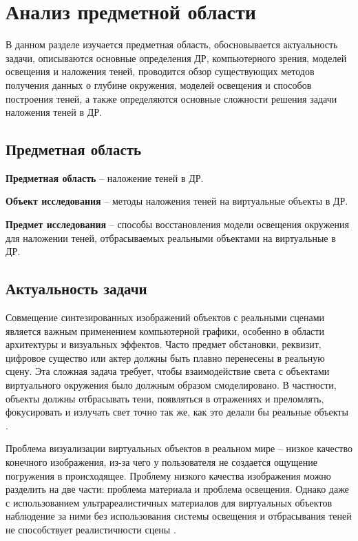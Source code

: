 \chapter{Анализ предметной области}

В данном разделе изучается предметная область, обосновывается актуальность задачи, описываются основные определения ДР, компьютерного зрения, моделей освещения и наложения теней, проводится обзор существующих методов получения данных о глубине окружения, моделей освещения и способов построения теней, а также определяются основные сложности решения задачи наложения теней в ДР.

\section{Предметная область}

\textbf{Предметная область} -- наложение теней в ДР.

\textbf{Объект исследования} -- методы наложения теней на виртуальные объекты в ДР.

\textbf{Предмет исследования} -- способы восстановления модели освещения окружения для наложении теней, отбрасываемых реальными объектами на виртуальные в ДР.

\section{Актуальность задачи}

Совмещение синтезированных изображений объектов с реальными сценами является важным применением компьютерной графики, особенно в области архитектуры и визуальных эффектов. Часто предмет обстановки, реквизит, цифровое существо или актер должны быть плавно перенесены в реальную сцену. Эта сложная задача требует, чтобы взаимодействие света с объектами виртуального окружения было должным образом смоделировано. В частности, объекты должны отбрасывать тени, появляться в отражениях и преломлять, фокусировать и излучать свет точно так же, как это делали бы реальные объекты \cite{debevec2008rendering}.

Проблема визуализации виртуальных объектов в реальном мире -- низкое качество конечного изображения, из-за чего у пользователя не создается ощущение погружения в происходящее. Проблему низкого качества изображения можно разделить на две части: проблема материала и проблема освещения. Однако даже с использованием ультрареалистичных материалов для виртуальных объектов наблюдение за ними без использования системы освещения и отбрасывания теней не способствует реалистичности сцены \cite{osti2019real}.

